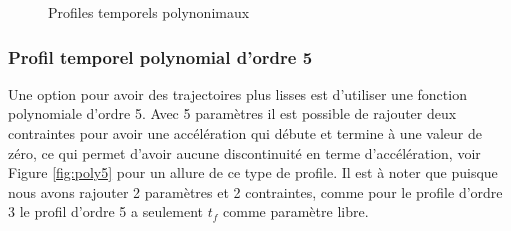 \begin{figure}[ht]
        \centering
        \caption{Profiles temporels polynonimaux}
			\label{fig:poly_profile}
\end{figure}

\subsubsection{Profil temporel polynomial d'ordre 5}

Une option pour avoir des trajectoires plus lisses est d'utiliser une fonction polynomiale d'ordre 5. Avec 5 paramètres il est possible de rajouter deux contraintes pour avoir une accélération qui débute et termine à une valeur de zéro, ce qui permet d'avoir aucune discontinuité en terme d'accélération, voir Figure \ref{fig:poly5} pour un allure de ce type de profile. Il est à noter que puisque nous avons rajouter 2 paramètres et 2 contraintes, comme pour le profile d'ordre 3 le profil d'ordre 5 a seulement $t_f$ comme paramètre libre. 



